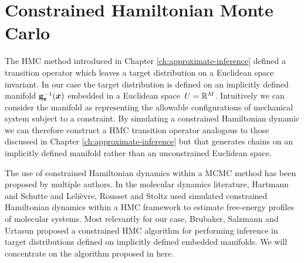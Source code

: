 \section{Constrained Hamiltonian Monte Carlo}\label{sec:chmc}

The \ac{HMC} method introduced in Chapter \ref{ch:approximate-inference} defined a transition operator which leaves a target distribution on a Euclidean space invariant. In our case the target distribution is defined on an implicitly defined manifold ${\mathbf{g}}_{\boldsymbol{\mathsf{x}}}^{-1}(\boldsymbol{x})$ embedded in a Euclidean space $\mathit{U}=\mathbb{R}^M$. Intuitively we can consider the manifold as representing the allowable configurations of mechanical system subject to a constraint. By simulating a constrained Hamiltonian dynamic we can therefore construct a \ac{HMC} transition operator analogous to those discussed in Chapter \ref{ch:approximate-inference} but that generates chains on an implicitly defined manifold rather than an unconstrained Euclidean space.

The use of constrained Hamiltonian dynamics within a \ac{MCMC} method has been proposed by multiple authors. In the molecular dynamics literature, Hartmann and Schutte \citep{hartmann2005constrained} and Leli{\`e}vre, Rousset and Stoltz \citep{lelievre2012langevin} used simulated constrained Hamiltonian dynamics within a \ac{HMC} framework to estimate free-energy profiles of molecular systems. Most relevantly for our case, Brubaker, Salzmann and Urtasun \citep{brubaker2012family} proposed a constrained \ac{HMC} algorithm for performing inference in target distributions defined on implicitly defined embedded manifolds. We will concentrate on the algorithm proposed in \citep{brubaker2012family} here. %

